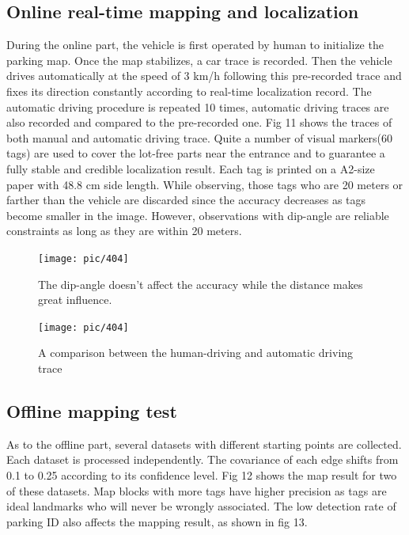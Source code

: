 \documentclass[journal]{IEEEtran}
\begin{document}
\subsection{Online real-time mapping and localization}
During the online part, the vehicle is first operated by human to initialize the parking map. 
Once the map stabilizes, a car trace is recorded.
Then the vehicle drives automatically at the speed of 3 km/h following this pre-recorded trace and fixes its direction constantly according to real-time localization record.
The automatic driving procedure is repeated 10 times, automatic driving traces are also recorded and compared to the pre-recorded one.
Fig 11 shows the traces of both manual and automatic driving trace.
Quite a number of visual markers(60 tags) are used to cover the lot-free parts near the entrance and to guarantee a fully stable and credible localization result.
Each tag is printed on a A2-size paper with 48.8 cm side length.
While observing, those tags who are 20 meters or farther than the vehicle are discarded since the accuracy decreases as tags become smaller in the image.
However, observations with dip-angle are reliable constraints as long as they are within 20 meters.

\begin{figure}[htbp]
\centering
\texttt{[image: pic/404]}
\caption{
The dip-angle doesn't affect the accuracy while the distance makes great influence.%
}\label{fig:10}
\end{figure}

\begin{figure}[htbp]
\centering
\texttt{[image: pic/404]}
\caption{
A comparison between the human-driving and automatic driving trace%
}\label{fig:11}
\end{figure}

\subsection{Offline mapping test}
As to the offline part, several datasets with different starting points are collected. 
Each dataset is processed independently.
The covariance of each edge shifts from 0.1 to 0.25 according to its confidence level.
Fig 12 shows the map result for two of these datasets.
Map blocks with more tags have higher precision as tags are ideal landmarks who will never be wrongly associated.
The low detection rate of parking ID also affects the mapping result, as shown in fig 13.
\end{document}
